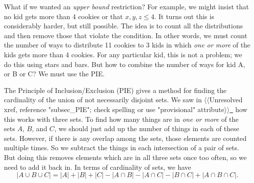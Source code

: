 \documentclass[10pt,]{book}
\theoremstyle{plain}
\theoremstyle{definition}
\theoremstyle{definition}
\theoremstyle{definition}
\theoremstyle{definition}
\numberwithin{equation}{chapter}
\begin{document}
\par
\hypertarget{p-839}{}%
What if we wanted an \emph{upper bound} restriction? For example, we might insist that no kid gets more than 4 cookies or that \(x, y, z \le 4\). It turns out this is considerably harder, but still possible. The idea is to count all the distributions and then remove those that violate the condition. In other words, we must count the number of ways to distribute 11 cookies to 3 kids in which \emph{one or more} of the kids gets more than 4 cookies. For any particular kid, this is not a problem; we do this using stars and bars. But how to combine the number of ways for kid A, or B or C? We must use the PIE.%
\par
\hypertarget{p-840}{}%
The Principle of Inclusion/Exclusion (PIE) gives a method for finding the cardinality of the union of not necessarily disjoint sets. We saw in {$\langle\langle$Unresolved xref, reference "subsec\_PIE"; check spelling or use "provisional" attribute$\rangle\rangle$}\hyperlink{}{~} how this works with three sets. To find how many things are in \emph{one or more} of the sets \(A\), \(B\), and \(C\), we should just add up the number of things in each of these sets. However, if there is any overlap among the sets, those elements are counted multiple times. So we subtract the things in each intersection of a pair of sets. But doing this removes elements which are in all three sets once too often, so we need to add it back in. In terms of cardinality of sets, we have%
\begin{equation*}
|A \cup B \cup C| = |A| + |B| + |C| - |A \cap B| - |A \cap C| - |B \cap C| + |A\cap B \cap C|.
\end{equation*}
%
\end{document}
